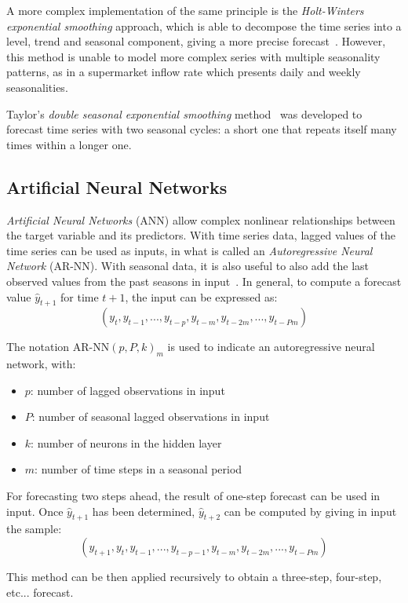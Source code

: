 A more complex implementation of the same principle is the \emph{Holt-Winters exponential smoothing} approach, which is able to decompose the time series into a level, trend and seasonal component, giving a more precise forecast~\cite{holt,winters}. However, this method is unable to model more complex series with multiple seasonality patterns, as in a supermarket inflow rate which presents daily and weekly seasonalities.

Taylor’s \emph{double seasonal exponential smoothing} method~\cite{taylor} was developed to forecast time series with two seasonal cycles: a short one that repeats itself many times within a longer one.

\subsection{Artificial Neural Networks}
\label{subsec:artificial_neural_networks}

\emph{Artificial Neural Networks} (ANN) allow complex nonlinear relationships between the target variable and its predictors. With time series data, lagged values of the time series can be used as inputs, in what is called an \emph{Autoregressive Neural Network} (AR-NN). With seasonal data, it is also useful to also add the last observed values from the past seasons in input~\cite{hyndman2018}. In general, to compute a forecast value \( \hat{y}_{t+1} \) for time \( t+1 \), the input can be expressed as:
\[
  (y_{t}, y_{t-1}, ..., y_{t-p}, y_{t-m}, y_{t-2m}, ..., y_{t-Pm})
\]

The notation \( \text{AR-NN}(p, P, k)_m \) is used to indicate an autoregressive neural network, with:
\begin{itemize}
  \item \( p \): number of lagged observations in input
  \item \( P \): number of seasonal lagged observations in input
  \item \( k \): number of neurons in the hidden layer
  \item \( m \): number of time steps in a seasonal period
\end{itemize}

For forecasting two steps ahead, the result of one-step forecast can be used in input. Once \( \hat{y}_{t+1} \) has been determined, \( \hat{y}_{t+2} \) can be computed by giving in input the sample:
\[ (\hat{y}_{t+1}, y_{t}, y_{t-1}, ..., y_{t-p-1}, y_{t-m}, y_{t-2m}, ..., y_{t-Pm}) \]

This method can be then applied recursively to obtain a three-step, four-step, etc... forecast.

